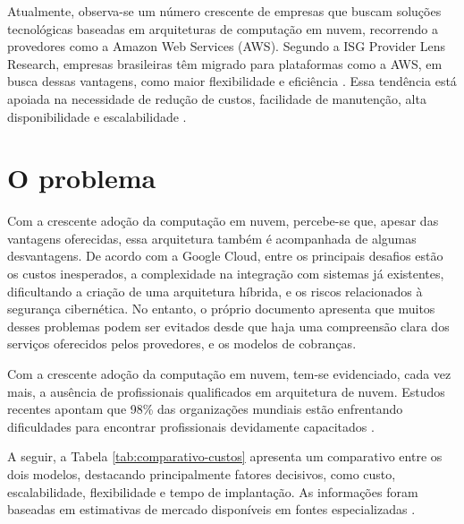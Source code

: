Atualmente, observa-se um número crescente de empresas que buscam soluções tecnológicas baseadas em arquiteturas de computação em nuvem, recorrendo a provedores como a Amazon Web Services (AWS).  Segundo a ISG Provider Lens Research, empresas brasileiras têm migrado para plataformas como a AWS, em busca dessas vantagens, como maior flexibilidade e eficiência \cite{businesswire2022aws}.
Essa tendência está apoiada na necessidade de redução de custos, facilidade de manutenção, alta disponibilidade e escalabilidade \cite{aws2023vantagens}.



\section{O problema}
\label{sec:intro:prob}

Com a crescente adoção da computação em nuvem, percebe-se que, apesar das vantagens oferecidas, essa arquitetura também é acompanhada de algumas desvantagens. De acordo com a Google Cloud, entre os principais desafios estão os custos inesperados, a complexidade na integração com sistemas já existentes, dificultando a criação de uma arquitetura híbrida, e os riscos relacionados à segurança cibernética. No entanto, o próprio documento apresenta que muitos desses problemas podem ser evitados desde que haja uma compreensão clara dos serviços oferecidos pelos provedores,  e os modelos de cobranças\cite{google2024limites}.

Com a crescente adoção da computação em nuvem, tem-se evidenciado, cada vez mais, a ausência de profissionais qualificados em arquitetura de nuvem. Estudos recentes apontam que 98\% das organizações mundiais estão enfrentando dificuldades para encontrar profissionais devidamente capacitados \cite{softwareone2024}.


A seguir, a Tabela \ref{tab:comparativo-custos} apresenta um comparativo entre os dois modelos, destacando principalmente fatores decisivos, como custo, escalabilidade, flexibilidade e tempo de implantação. As informações foram baseadas em estimativas de mercado disponíveis em fontes especializadas \cite{tecnomega2024}.


